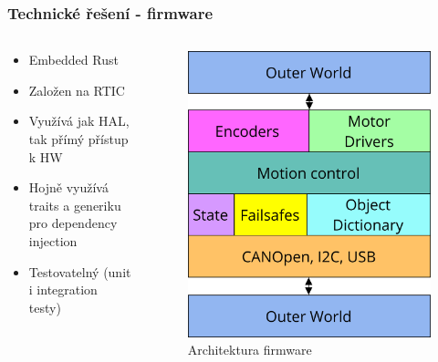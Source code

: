 \documentclass[%
  12pt,       				%
	t,                  %
	aspectratio=1610,   %
	unicode,						%
]{beamer}				    	%
\begin{document}
\begin{frame}
	\frametitle{Technické řešení - firmware}
	\begin{columns}[T] 								%
		\begin{column}{0.5\textwidth}		%
			\begin{itemize}
				\item Embedded Rust
				\item Založen na RTIC
				\item Využívá jak HAL, tak přímý přístup k HW
				\item Hojně využívá traits a generiku pro dependency injection
				\item Testovatelný (unit i integration testy)
			\end{itemize}
		\end{column}
		\begin{column}{0.5\textwidth}		%
			\begin{figure}%
				\centering
				\includegraphics[width=0.7\columnwidth]{../Thesis/obrazky/firmware_arch}
				\caption{Architektura firmware}%
				\label{fig:sm4_block}
			\end{figure}
		\end{column}
	\end{columns}
\end{frame}
\end{document}
